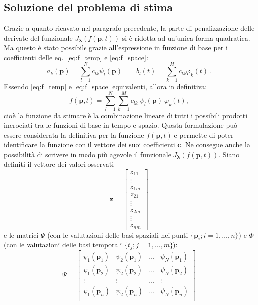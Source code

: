 \documentclass[a4paper,11pt,twoside,openright]{book}							%
\begin{document}
\subsection{Soluzione del problema di stima}
Grazie a quanto ricavato nel paragrafo precedente, la parte di penalizzazione delle derivate del funzionale $J_{\bm \lambda }(f(\bm p,t))$ si è ridotta ad un'unica forma quadratica. Ma questo è stato possibile grazie all'espressione in funzione di base per i coefficienti delle eq.~\ref{eq:f_temp} e \ref{eq:f_space}:
$$
a_k(\bm p)=\sum_{l=1}^N c_{lk}\psi_l(\bm p) \qquad b_l(t)=\sum_{k=1}^M c_{lk}\varphi_k(t) \ .
$$
Essendo \ref{eq:f_temp} e \ref{eq:f_space} equivalenti, allora in definitiva:
\begin{equation} 
\label{eq:basisexp}
f(\bm p,t)=\sum_{l=1}^N \sum_{k=1}^M c_{lk}\ \psi_l(\bm p)\ \varphi_k(t) ,
\end{equation}
cioè la funzione da stimare è la combinazione lineare di tutti i possibili prodotti incrociati tra le funzioni di base in tempo e spazio. Questa formulazione può essere considerata la definitiva per la funzione $f(\bm p,t)$ e permette di poter identificare la funzione con il vettore dei suoi coefficienti $\bm{c}$. Ne consegue anche la possibilità di scrivere in modo più agevole il funzionale $J_{\bm \lambda }(f(\bm p,t))$. Siano definiti il vettore dei valori osservati
\begin{equation}
\bm z =
\begin{bmatrix}
z_{11}  \\
\vdots\\
z_{1m}  \\
z_{21}  \\
\vdots\\
z_{2m}  \\
\vdots\\
z_{nm}
\end{bmatrix}
\end{equation}
e le matrici $\Psi$ (con le valutazioni delle basi spaziali nei punti $\{\bm p_i; i = 1,\ldots,n\}$) e $\Phi$ (con le valutazioni delle basi temporali $\{t_j; j = 1,\ldots,m\}$):
$$
\Psi =
\begin{bmatrix}
\psi_{1}(\bm p_1) & \psi_{2}(\bm p_1) & \hdots & \psi_{N}(\bm p_1)  \\
\psi_{1}(\bm p_2) & \psi_{2}(\bm p_2) & \hdots & \psi_{N}(\bm p_2)  \\
\vdots & \vdots & \hdots & \vdots \\
\psi_{1}(\bm p_n) & \psi_{2}(\bm p_n) & \hdots & \psi_{N}(\bm p_n)  \\
\end{bmatrix}
$$
\end{document}
